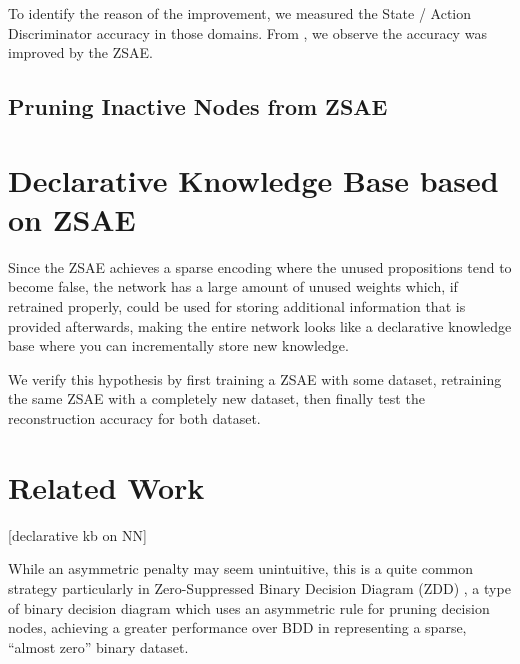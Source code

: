 \begin{table}[htb]
 \vspace{2in}
 \caption{}
 \label{tab:ama2}
\end{table}

To identify the reason of the improvement, we measured the State / Action Discriminator accuracy in those domains.
From , we observe the accuracy was improved by the ZSAE.

\begin{figure}[htb]
 \vspace{2in}
 \caption{}
 \label{fig:ama2-ad}
\end{figure}

\subsection{Pruning Inactive Nodes from ZSAE}

\section{Declarative Knowledge Base based on ZSAE}

Since the ZSAE achieves a sparse encoding where the unused propositions
tend to become false, the network has a large amount of unused weights
which, if retrained properly, could be used for storing additional
information that is provided afterwards, making the entire network looks
like a declarative knowledge base where you can incrementally store
new knowledge.

We verify this hypothesis by first training a ZSAE with some dataset, retraining the same ZSAE with
a completely new dataset, then finally test the reconstruction accuracy for both dataset.

\section{Related Work}


[declarative kb on NN]




While an asymmetric penalty may seem unintuitive, this is a quite common
strategy particularly in Zero-Suppressed Binary Decision Diagram (ZDD)
\cite{minato1993zero}, a type of binary decision diagram \cite{bryant1986graph} which
uses an asymmetric rule for pruning decision nodes, achieving a greater
performance over BDD in representing a sparse, ``almost zero'' binary dataset.

